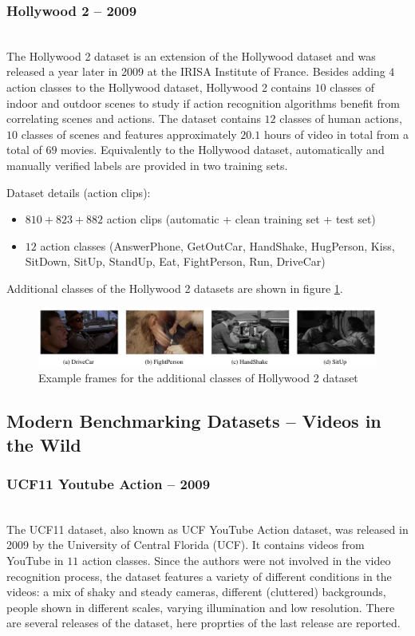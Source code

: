 \subsubsection{Hollywood 2 -- 2009}
\cite{marszalek_actions_2009}\\
The Hollywood 2 dataset is an extension of the Hollywood dataset and was released a year later in 2009 at the IRISA Institute of France.
Besides adding $4$ action classes to the Hollywood dataset, Hollywood 2 contains $10$ classes of indoor and outdoor scenes to study if action recognition algorithms benefit from correlating scenes and actions.
The dataset contains $12$ classes of human actions, $10$ classes of scenes and features approximately $20.1$ hours of video in total from a total of $69$ movies.
Equivalently to the Hollywood dataset, automatically and manually verified labels are provided in two training sets.

Dataset details (action clips): \cite{_ivan_????-1}
\begin{itemize}
    \item $810 + 823 + 882$ action clips (automatic + clean training set + test set)
    \item $12$ action classes (AnswerPhone, GetOutCar, HandShake, HugPerson, Kiss, SitDown, SitUp, StandUp, Eat, FightPerson, Run, DriveCar)
\end{itemize}

Additional classes of the Hollywood 2 datasets are shown in figure \ref{fig:hollywood2_example}.

\begin{figure}[H]
    \centering
    \includegraphics[width=\textwidth]{img_datasets/hollywood2_example}
    \caption{Example frames for the additional classes of Hollywood 2 dataset \cite{marszalek_actions_2009}}
    \label{fig:hollywood2_example}
\end{figure}


\subsection{Modern Benchmarking Datasets -- Videos in the Wild}


\subsubsection{UCF11 Youtube Action -- 2009}
\cite{liu_recognizing_2009}\\
The UCF11 dataset, also known as UCF YouTube Action dataset, was released in 2009 by the University of Central Florida (UCF).
It contains videos from YouTube in $11$ action classes.
Since the authors were not involved in the video recognition process, the dataset features a variety of different conditions in the videos: a mix of shaky and steady cameras, different (cluttered) backgrounds, people shown in different scales, varying illumination and low resolution.
There are several releases of the dataset, here proprties of the last release are reported.

